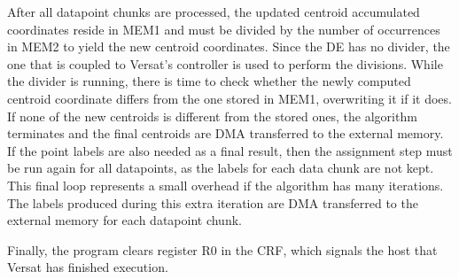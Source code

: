 After all datapoint chunks are processed, the updated centroid
accumulated coordinates reside in MEM1 and must be divided by the
number of occurrences in MEM2 to yield the new centroid
coordinates. Since the DE has no divider, the one that is coupled to
Versat's controller is used to perform the divisions. While the
divider is running, there is time to check whether the newly computed
centroid coordinate differs from the one stored in MEM1, overwriting
it if it does. If none of the new centroids is different from the
stored ones, the algorithm terminates and the final centroids are
DMA transferred to the external memory. If the point labels are also
needed as a final result, then the assignment step must be run again
for all datapoints, as the labels for each data chunk are not
kept. This final loop represents a small overhead if the algorithm has
many iterations. The labels produced during this extra iteration are
DMA transferred to the external memory for each datapoint chunk.

Finally, the program clears register R0 in the CRF, which signals the
host that Versat has finished execution.
